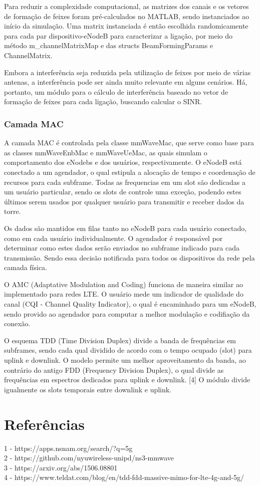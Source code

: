 \documentclass{article}
\begin{document}
Para reduzir a complexidade computacional, as matrizes dos canais e os vetores de formação de feixes foram pré-calculados no MATLAB, sendo instanciados ao início da simulação. Uma matrix instanciada é então escolhida randomicamente para cada par dispositivo-eNodeB para caracterizar a ligação, por meio do método m\_channelMatrixMap e das structs BeamFormingParams e ChannelMatrix.

Embora a interferência seja reduzida pela utilização de feixes por meio de várias antenas, a interferência pode ser ainda muito relevante em alguns cenários. Há, portanto, um módulo para o cálculo de interferência baseado no vetor de formação de feixes para cada ligação, buscando calcular o SINR.

\subsubsection{Camada MAC}
A camada MAC é controlada pela classe mmWaveMac, que serve como base para as classes mmWaveEnbMac e mmWaveUeMac, as
quais simulam o comportamento dos eNodebs e dos usuários, respectivamente. O eNodeB está conectado a um agendador, o
qual estipula a alocação de tempo e coordenação de recursos para cada subframe. Todas as frequencias em um slot são
dedicadas a um usuário particular, sendo os slots de controle uma exceção, podendo estes últimos serem usados por
qualquer usuário para transmitir e receber dados da torre.

Os dados são mantidos em filas tanto no eNodeB para cada usuário conectado, como em cada usuário individualmente. O
agendador é responsável por determinar como estes dados serão enviados no subframe indicado para cada transmissão. Sendo
essa decisão notificada para todos os dispositivos da rede pela camada física.

O AMC (Adaptative Modulation and Coding) funciona de maneira similar ao implementado para redes LTE. O usuário mede um
indicador de qualidade do canal (CQI - Channel Quality Indicator), o qual é encaminhado para um eNodeB, sendo provido ao
agendador para computar a melhor modulação e codifiação da conexão. 

O esquema TDD (Time Division Duplex) divide a banda de frequências em subframes, sendo cada qual dividido de acordo com
o tempo ocupado (slot) para uplink e downlink. O modelo permite um melhor aproveitamento da banda, ao contrário do
antigo FDD (Frequency Division Duplex), o qual divide as frequências em espectros dedicados para uplink e downlink. [4] O
módulo divide igualmente os slots temporais entre downlink e uplink.


\section{Referências}
1 - https://apps.nsnam.org/search/?q=5g \\
2 - https://github.com/nyuwireless-unipd/ns3-mmwave \\
3 - https://arxiv.org/abs/1506.08801 \\
4 - https://www.teldat.com/blog/en/tdd-fdd-massive-mimo-for-lte-4g-and-5g/
\end{document}

